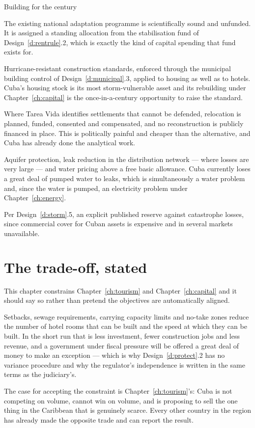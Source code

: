 \begin{design}{Building for the century}
\label{d:adapt}
\begin{rules}
 The existing national adaptation programme is
scientifically sound and unfunded. It is assigned a standing allocation from the
stabilisation fund of Design~\ref{d:rentrule}.2, which is exactly the kind of
capital spending that fund exists for.

 Hurricane-resistant construction standards, enforced
through the municipal building control of Design~\ref{d:municipal}.3, applied to
housing as well as to hotels. Cuba's housing stock is its most storm-vulnerable
asset and its rebuilding under Chapter~\ref{ch:capital} is the once-in-a-century
opportunity to raise the standard.

 Where Tarea Vida identifies settlements that cannot be
defended, relocation is planned, funded, consented and compensated, and no
reconstruction is publicly financed in place. This is politically painful and
cheaper than the alternative, and Cuba has already done the analytical work.

 Aquifer protection, leak reduction in the distribution network ---
where losses are very large --- and water pricing above a free basic allowance.
Cuba currently loses a great deal of pumped water to leaks, which is
simultaneously a water problem and, since the water is pumped, an electricity
problem under Chapter~\ref{ch:energy}.

 Per Design~\ref{d:storm}.5, an explicit published
reserve against catastrophe losses, since commercial cover for Cuban assets is
expensive and in several markets unavailable.
\end{rules}
\end{design}

\section{The trade-off, stated}

This chapter constrains Chapter~\ref{ch:tourism} and Chapter~\ref{ch:capital}
and it should say so rather than pretend the objectives are automatically
aligned.

Setbacks, sewage requirements, carrying capacity limits and no-take zones reduce
the number of hotel rooms that can be built and the speed at which they can be
built. In the short run that is less investment, fewer construction jobs and less
revenue, and a government under fiscal pressure will be offered a great deal of
money to make an exception --- which is why Design~\ref{d:protect}.2 has no
variance procedure and why the regulator's independence is written in the same
terms as the judiciary's.

The case for accepting the constraint is Chapter~\ref{ch:tourism}'s: Cuba is not
competing on volume, cannot win on volume, and is proposing to sell the one thing
in the Caribbean that is genuinely scarce. Every other country in the region has
already made the opposite trade and can report the result.

